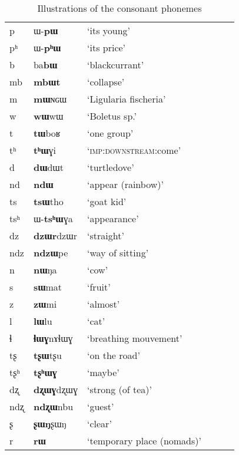 \documentclass[oldfontcommands,oneside,a4paper,11pt]{article}
\newcommand{\ipa}[1]{{\phon #1}} %
\begin{document}
 \begin{table}
 \caption{Illustrations of the consonant phonemes} \label{tab:consonants2}
 \begin{tabular}{lll|lll}
\toprule
p & \ipa{ɯ-\textbf{pɯ}}& `its young'& &&\\
pʰ & \ipa{ɯ-\textbf{pʰɯ}}& `its price'& &&\\
b & \ipa{ba\textbf{bɯ}}& `blackcurrant'& &&\\
mb & \ipa{\textbf{mbɯt}}& `collapse' & &&\\
m &  \ipa{\textbf{mɯ}ɴɢɯ} & `Ligularia fischeria'& &&\\
w &  \ipa{\textbf{wɯ}wɯ} & `Boletus sp.'& &&\\
t &  \ipa{\textbf{tɯ}boʁ} & `one group'& &&\\
tʰ &  \ipa{\textbf{tʰɯ}ɣi} & `\textsc{imp:downstream}:come'& &&\\
d &  \ipa{\textbf{dɯ}dɯt} & `turtledove'& &&\\
nd &  \ipa{\textbf{ndɯ}} & `appear (rainbow)'& &&\\
ts &  \ipa{\textbf{tsɯ}tho}  & `goat kid'& &&\\
tsʰ &  \ipa{ɯ-\textbf{tsʰɯ}ɣa}  & `appearance'& &&\\
dz &  \ipa{\textbf{dzɯr}dzɯr}  & `straight'& &&\\
ndz  &  \ipa{\textbf{ndzɯ}pe}  & `way of sitting'& &&\\
n  &  \ipa{\textbf{nɯ}ŋa}  & `cow'& &&\\
s  &  \ipa{\textbf{sɯ}mat}  & `fruit'& &&\\
z  &  \ipa{\textbf{zɯ}mi}  & `almost'& &&\\
l  &  \ipa{\textbf{lɯ}lu}  & `cat'& &&\\
ɬ  &  \ipa{\textbf{ɬɯɣ}nɤɬɯɣ}  & `breathing mouvement'& &&\\
tʂ  &  \ipa{\textbf{tʂɯ}tʂu}  & `on the road'& &&\\
tʂʰ  &  \ipa{\textbf{tʂʰɯɣ}}  & `maybe'& &&\\
dʐ  &\ipa{\textbf{dʐɯɣ}dʐɯɣ}  & `strong (of tea)'& &&\\
ndʐ&\ipa{\textbf{ndʐɯ}nbu}  & `guest'& &&\\
ʂ&\ipa{\textbf{ʂɯŋ}ʂɯŋ}  & `clear'& &&\\
r&\ipa{\textbf{rɯ}}  & `temporary place (nomads)'& &&\\

\bottomrule
\end{tabular}
\end{table}
\end{document}
